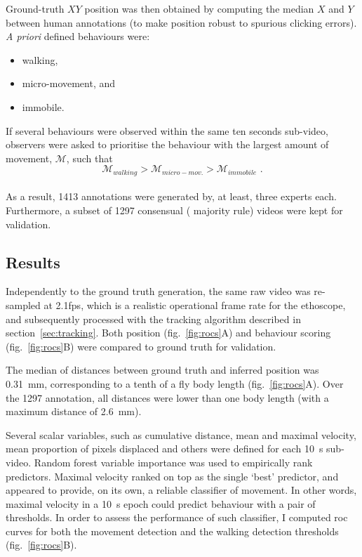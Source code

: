 Ground-truth $XY$ position was then obtained by computing the median $X$ and $Y$ between human annotations (to make position robust to spurious clicking errors).
\emph{A priori} defined behaviours were: 

\begin{itemize}
	\item walking,
	\item micro-movement, and
	\item immobile.
\end{itemize}

If several behaviours were observed within the same ten seconds sub-video, observers were asked to prioritise the behaviour with the largest amount of movement, $\mathcal{M}$, such that
$$\mathcal{M}_{walking} > \mathcal{M}_{micro-mov.} > \mathcal{M}_{immobile}\text{ .}$$\\
As a result, 1413 annotations were generated by, at least, three experts each. 
Furthermore, a subset of 1297 consensual (\ie{} majority rule) videos were kept for validation.

\subsection{Results}

Independently to the ground truth generation, the same raw video was re-sampled at 2.1\acrshort{fps}, which is a realistic operational frame rate for the ethoscope, and subsequently processed with the tracking algorithm described in section~\ref{sec:tracking}.
Both position (fig.~\ref{fig:rocs}A) and behaviour scoring (fig.~\ref{fig:rocs}B) were compared to ground truth for validation.

The median of distances between ground truth and inferred position was
0.31~mm, corresponding to a tenth of a fly body length (fig.~\ref{fig:rocs}A).
Over the 1297 annotation, all distances were lower than one body length (with a maximum distance of 2.6~mm).

Several scalar variables, such as cumulative distance, mean and maximal velocity, mean proportion of pixels displaced and others were defined for each 10~s sub-video. Random forest variable importance\cite{breiman_random_2001} was used
to empirically rank predictors.
Maximal velocity ranked on top as the single `best' predictor, 
and appeared to provide, on its own, a reliable classifier of movement.
In other words, maximal velocity in a 10~s  epoch could predict behaviour with a pair of thresholds.
In order to assess the performance of such classifier, I computed \gls{roc} curves for both the movement detection and the walking detection thresholds (fig.~\ref{fig:rocs}B).


